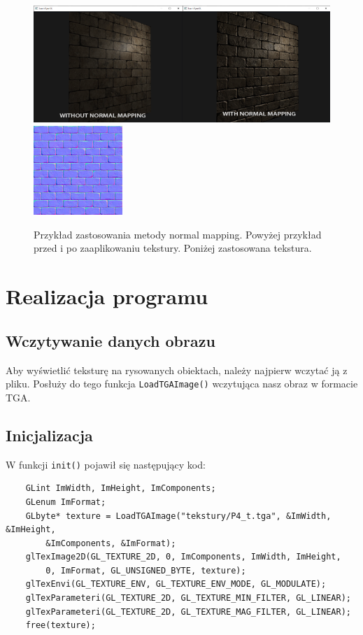 \documentclass[a4paper]{article}
\begin{document}
\begin{figure}[H]
    \centering
    \includegraphics[width=\textwidth]{normalmapping}
    \includegraphics[width=0.3\textwidth]{normal_mapping_normal_map}

    \caption{Przykład zastosowania metody normal mapping. Powyżej przykład przed
        i po zaaplikowaniu tekstury. Poniżej zastosowana tekstura.}
\end{figure}


\section{Realizacja programu}

\subsection{Wczytywanie danych obrazu}

Aby wyświetlić teksturę na rysowanych obiektach, należy najpierw wczytać ją z
pliku. Posłuży do tego funkcja \texttt{LoadTGAImage()} wczytująca nasz
obraz w formacie TGA.

\subsection{Inicjalizacja}

W funkcji \texttt{init()} pojawił się następujący kod:

\begin{verbatim}
    GLint ImWidth, ImHeight, ImComponents;
    GLenum ImFormat;
    GLbyte* texture = LoadTGAImage("tekstury/P4_t.tga", &ImWidth, &ImHeight,
        &ImComponents, &ImFormat);
    glTexImage2D(GL_TEXTURE_2D, 0, ImComponents, ImWidth, ImHeight,
        0, ImFormat, GL_UNSIGNED_BYTE, texture);
    glTexEnvi(GL_TEXTURE_ENV, GL_TEXTURE_ENV_MODE, GL_MODULATE);
    glTexParameteri(GL_TEXTURE_2D, GL_TEXTURE_MIN_FILTER, GL_LINEAR);
    glTexParameteri(GL_TEXTURE_2D, GL_TEXTURE_MAG_FILTER, GL_LINEAR);
    free(texture);
\end{verbatim}
\end{document}
